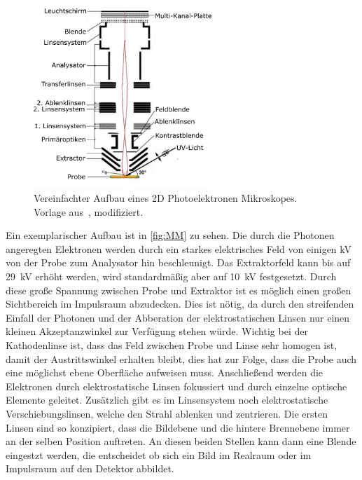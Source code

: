         \begin{figure}
            \centering
            \includegraphics[width=0.6\textwidth]{PEEM_schemaneu.png}
            \caption{Vereinfachter Aufbau eines 2D Photoelektronen Mikroskopes. Vorlage aus~\cite{KUCH}, modifiziert.}
            \label{fig:MM}
        \end{figure}
        Ein exemplarischer Aufbau ist in \autoref{fig:MM} zu sehen.
        Die durch die Photonen angeregten Elektronen werden durch ein starkes elektrisches Feld von einigen \si{\kilo\volt} von der Probe zum Analysator hin beschleunigt.
        Das Extraktorfeld kann bis auf \SI{29}{\kilo\volt} erhöht werden, wird standardmäßig aber auf \SI{10}{\kilo\volt} festgesetzt.
        Durch diese große Spannung zwischen Probe und Extraktor ist es möglich einen großen Sichtbereich im Impulsraum abzudecken.
        Dies ist nötig, da durch den streifenden Einfall der Photonen und der Abberation der elektrostatischen Linsen nur einen kleinen Akzeptanzwinkel zur Verfügung stehen würde.
        Wichtig bei der Kathodenlinse ist, dass das Feld zwischen Probe und Linse sehr homogen ist, damit der Austrittswinkel erhalten bleibt, dies hat zur Folge, dass die Probe auch eine möglichst ebene Oberfläche aufweisen muss.
        Anschließend werden die Elektronen durch elektrostatische Linsen fokussiert und durch einzelne optische Elemente geleitet.
        Zusätzlich gibt es im Linsensystem noch elektrostatische Verschiebungslinsen, welche den Strahl ablenken und zentrieren.
        Die ersten Linsen sind so konzipiert, dass die Bildebene und die hintere Brennebene immer an der selben Position auftreten.
        An diesen beiden Stellen kann dann eine Blende eingestzt werden, die entscheidet ob sich ein Bild im Realraum oder im Impulsraum auf den Detektor abbildet.


